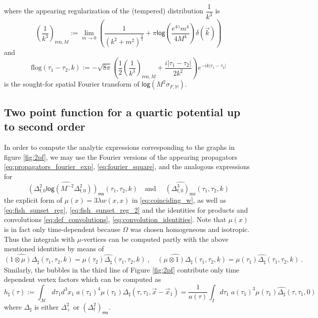 \documentclass[11pt]{book}
\newcommand{\ms}{\mathsf{ms}}
\renewcommand{\log}{\mathsf{log}}
\newcommand{\Mcal}{\mathcal{M}}
\newcommand{\Mbb}{\mathbb{M}}
\newcommand{\fsf}{\mathsf{f}}
\theoremstyle{break}
\begin{document}
%
where the appearing regularization of the (tempered) distribution $\dfrac{1}{k^3}$ is 
%
\begin{equation}
\left(\frac{1}{k^3}\right)_{\text{ren},M}:=\lim_{m\to 0}\left(\frac{1}{(k^2+m^2)^{\frac32}}+\pi\log\left(\frac{e^{4\gamma}m^4}{4 M^4}\right)\delta(\vec{k})\right)
\label{eq:regk3}
\end{equation}
and
\begin{equation}
\text{flog}(\tau_1-\tau_2,k):=-\sqrt{8\pi}\left(\frac{1}{2}\left(\frac{1}{k^3}\right)_{\text{ren},M}+\frac{i|\tau_1-\tau_2|}{2k^2}\right)e^{-ik|\tau_1-\tau_2|}
\label{eq:flog}
\end{equation}
%
is the sought-for spatial Fourier transform of $\log \left(M^2 \sigma_{F,\Mbb}\right)$. 

\subsection{Two point function for a quartic potential up to second order}


In order to compute the analytic expressions corresponding to the graphs in figure \ref{fig:2pf}, we may use the Fourier versions of the appearing propagators \eqref{eq:propagators_fourier_exp}, \eqref{eq:fourier_square}, and the analogous expressions for 
%
\begin{equation*}
\widehat{\left(\Delta^2_{\fsf,0}\log\left(M^{-2}\Delta^2_{\fsf,0}\right) \right)_\ms}(\tau_1,\tau_2,k) \quad \mbox{and } \quad \widehat{\left(\Delta^3_{\fsf,0}\right)_\text{ms}}(\tau_1,\tau_2,k)
\end{equation*}
%
the explicit form of $\mu(x)=3\lambda w(x,x)$ in \eqref{eq:coinciding_w}, as well as \eqref{eq:fish_sunset_reg}, \eqref{eq:fish_sunset_reg_2} and the identities for products and convolutions \eqref{eq:def_convolutions}, \eqref{eq:convolution_identities}. Note that $\mu(x)$ is in fact only time-dependent because $\Omega$ was chosen homogeneous and isotropic. Thus the integrals with $\mu$-vertices can be computed partly with the above mentioned identities by means of 
%
\begin{equation*}
\widehat{(1\otimes \mu) \Delta_{\sharp}}(\tau_1,\tau_2,k)=\mu(\tau_2)\widehat{\Delta_{\sharp}}(\tau_1,\tau_2,k) \ , \quad\widehat{(\mu\otimes 1) \Delta_{\sharp}}(\tau_1,\tau_2,k)=\mu(\tau_1)\widehat{\Delta_{\sharp}}(\tau_1,\tau_2,k) \ . 
\end{equation*}
%
Similarly, the bubbles in the third line of Figure \ref{fig:2pf} contribute only time dependent vertex factors which can be computed as 
%
\begin{equation*}
h_\sharp(\tau):=\int_\Mcal d\tau_1 d^3x_1\; a(\tau_1)^4\mu(\tau_1)\Delta_\sharp(\tau,\tau_1,\vec{x}-\vec{x}_1)=\frac{1}{a(\tau)}\int_I d\tau_1\;a(\tau_1)^3 \mu(\tau_1)\widehat{\Delta_\sharp}(\tau,\tau_1,0) 
\end{equation*}
%
where $\Delta_\sharp$ is either $\Delta^2_+$ or $\left(\Delta^2_\fsf\right)_\ms$.
\end{document}
